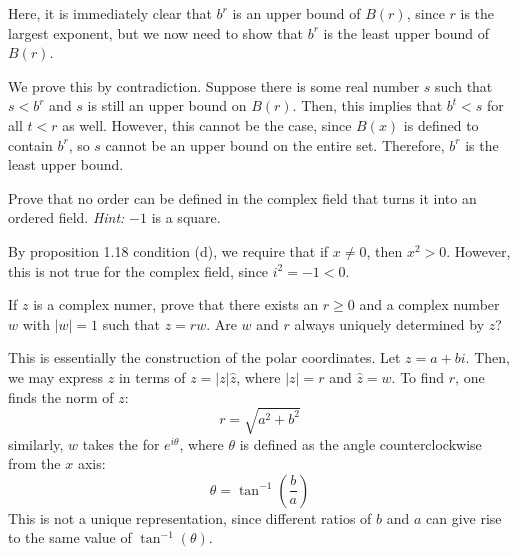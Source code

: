 \documentclass[10pt]{article}
\begin{document}
\begin{problem}
\begin{enumerate}[label=\alph*)]
				\begin{solution}
					Here, it is immediately clear that \( b^{r} \) is an upper bound of \( B(r) \), since \( r \) is 
					the largest exponent, but we now need to show that \( b^{r} \) is the least upper bound of 
					\( B(r) \).

					We prove this by contradiction. Suppose there is some real number \( s \) such that 
					\( s < b^{r} \) and \( s \) is still an upper bound on \( B(r) \). Then, this implies that 
					\( b^{t} < s \) for all \( t < r \) as well. However, this cannot be the case, since 
					\( B(x) \) is defined to contain \( b^{r} \), so \( s \) cannot be an upper 
					bound on the entire set. Therefore, \( b^{r} \) is the least upper bound.  
				\end{solution}
		\end{enumerate}
	\end{problem}

	\begin{problem}
		Prove that no order can be defined in the complex field that turns it into an ordered field. \textit{Hint:}
		\( -1 \) is a square. 
	\end{problem}

	\begin{solution}
		By proposition 1.18 condition (d), we require that if \( x \neq 0 \), then \( x^2 > 0 \). However, 
		this is not true for the complex field, since \( i^2 = -1 < 0 \).  
	\end{solution}

	\begin{problem}
		If \( z \) is a complex numer, prove that there exists an \( r \ge  0 \) and a complex 
		number \( w \) with \( |w| = 1 \) such that \( z = rw \). Are \( w \) and \( r \) always uniquely 
		determined by \( z \)? 
	\end{problem}

	\begin{solution}
		This is essentially the construction of the polar coordinates. Let \( z = a + bi \). Then, we 
		may express \( z \) in terms of \( z = |z| \hat{z} \), where \( |z| = r\)  and \( \hat{z} = w \). 
		To find \( r \), one finds the norm of \( z \):
		\[
		r = \sqrt{a^2 + b^2} 
		\] 
		similarly, \( w \) takes the for \( e^{i \theta} \), where \( \theta \) is defined as the angle 
		counterclockwise from the \( x \) axis:
		\[
		\theta = \tan^{-1}\left( \frac{b}{a} \right) 
		\] 
		This is not a unique representation, since different ratios of \( b  \) and \( a \) can give rise 
		to the same value of \( \tan^{-1}(\theta) \). 
	\end{solution}
\end{document}
